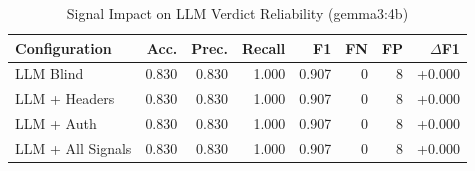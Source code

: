 \begin{table}[h]
\centering
\caption{Signal Impact on LLM Verdict Reliability (gemma3:4b)}
\label{tab:e5_signal_impact}
\begin{tabular}{l r r r r r r r}
\hline
Configuration & Acc. & Prec. & Recall & F1 & FN & FP & $\Delta$F1 \\
\hline
LLM Blind & 0.830 & 0.830 & 1.000 & 0.907 & 0 & 8 & +0.000 \\
LLM + Headers & 0.830 & 0.830 & 1.000 & 0.907 & 0 & 8 & +0.000 \\
LLM + Auth & 0.830 & 0.830 & 1.000 & 0.907 & 0 & 8 & +0.000 \\
LLM + All Signals & 0.830 & 0.830 & 1.000 & 0.907 & 0 & 8 & +0.000 \\
\hline
\end{tabular}
\end{table}